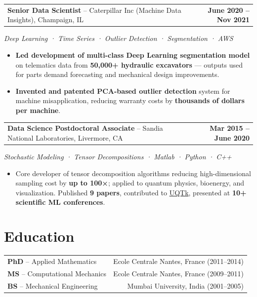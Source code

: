 \documentclass[10pt, letterpaper]{article}
\newcommand{\jobtitle}[1]{\textbf{#1}}
\newcommand{\employer}[1]{\textcolor{subtext}{#1}}
\newcommand{\daterange}[1]{\textbf{\textcolor{accent}{#1}}}
\newcommand{\techtags}[1]{\textit{\small\textcolor{subtext}{#1}}}
\begin{document}
\vspace{9pt}
\noindent\begin{tabularx}{\linewidth}{@{}X r@{}}
  \jobtitle{Senior Data Scientist} \employer{-- Caterpillar Inc (Machine Data Insights), Champaign, IL} & \daterange{June 2020 -- Nov 2021}
\end{tabularx}
\techtags{Deep Learning · Time Series · Outlier Detection · Segmentation · AWS}
\begin{itemize}\small
  \item \textbf{Led development of multi-class Deep Learning segmentation model} on telematics data from \textbf{50,000+ hydraulic excavators} — outputs used for parts demand forecasting and mechanical design improvements.
  \item \textbf{Invented and patented PCA-based outlier detection} system for machine misapplication, reducing warranty costs by \textbf{thousands of dollars per machine}.
\end{itemize}

\vspace{9pt}
\noindent\begin{tabularx}{\linewidth}{@{}X r@{}}
  \jobtitle{Data Science Postdoctoral Associate} \employer{-- Sandia National Laboratories, Livermore, CA} & \daterange{Mar 2015 -- June 2020}
\end{tabularx}
\techtags{Stochastic Modeling · Tensor Decompositions · Matlab · Python · C++}
\begin{itemize}\small
  \item Core developer of tensor decomposition algorithms reducing high-dimensional sampling cost by \textbf{up to 100×}; applied to quantum physics, bioenergy, and visualization. Published \textbf{9 papers}, contributed to \href{https://www.sandia.gov/uqtoolkit/}{UQTk}, presented at \textbf{10+ scientific ML conferences}.
\end{itemize}

\section{Education}

\noindent\begin{tabularx}{\linewidth}{@{}X r@{}}
  \textbf{PhD} -- Applied Mathematics & \textcolor{subtext}{Ecole Centrale Nantes, France \enspace (2011--2014)} \\[2pt]
  \textbf{MS} -- Computational Mechanics & \textcolor{subtext}{Ecole Centrale Nantes, France \enspace (2009--2011)} \\[2pt]
  \textbf{BS} -- Mechanical Engineering & \textcolor{subtext}{Mumbai University, India \enspace (2001--2005)} \\
\end{tabularx}
\end{document}
